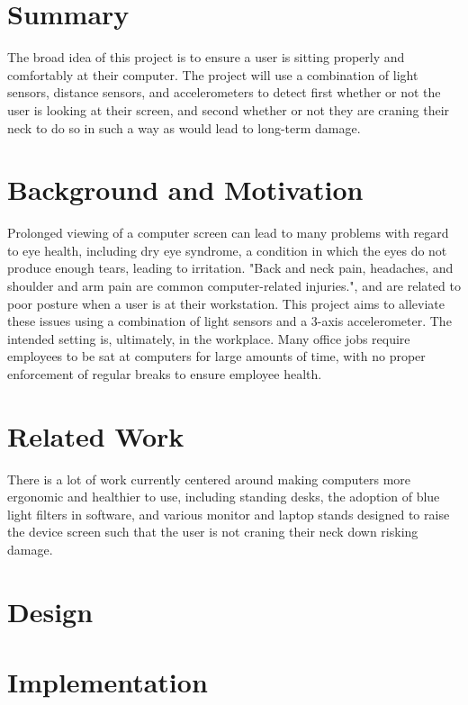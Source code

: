 \documentclass[12pt, a4paper]{report}
\begin{document}
\maketitle

\tableofcontents
\pagebreak

\section{Summary}
The broad idea of this project is to ensure a user is sitting properly and comfortably at their computer.
The project will use a combination of light sensors, distance sensors, and accelerometers to detect first whether or not the user is looking at their screen, and second whether or not they are craning their neck to do so in such a way as would lead to long-term damage.

\section{Background and Motivation}
Prolonged viewing of a computer screen can lead to many problems with regard to eye health, including dry eye syndrome\cite{dryeyes}, a condition in which the eyes do not produce enough tears, leading to irritation.
"Back and neck pain, headaches, and shoulder and arm pain are common computer-related injuries."\cite{vicgov}, and are related to poor posture when a user is at their workstation.
This project aims to alleviate these issues using a combination of light sensors and a 3-axis accelerometer.
The intended setting is, ultimately, in the workplace.
Many office jobs require employees to be sat at computers for large amounts of time, with no proper enforcement of regular breaks to ensure employee health.

\section{Related Work}
There is a lot of work currently centered around making computers more ergonomic and healthier to use, including standing desks, the adoption of blue light filters in software, and various monitor and laptop stands designed to raise the device screen such that the user is not craning their neck down risking damage.

\section{Design}


\section{Implementation}
\end{document}
